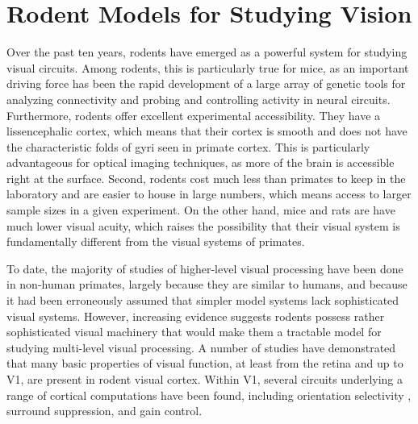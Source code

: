 \section{Rodent Models for Studying Vision}
Over the past ten years, rodents have emerged as a powerful system for studying visual circuits. Among rodents, this is particularly true for mice, as an important driving force has been the rapid development of a large array of genetic tools for analyzing connectivity and probing and controlling activity in neural circuits\cite{Luo2008, Luo2018}. Furthermore, rodents offer excellent experimental accessibility. They have a lissencephalic cortex, which means that their cortex is smooth and does not have the characteristic folds of gyri seen in primate cortex. This is particularly advantageous for optical imaging techniques, as more of the brain is accessible right at the surface. Second, rodents cost much less than primates to keep in the laboratory and are easier to house in large numbers, which means access to larger sample sizes in a given experiment. On the other hand, mice and rats are have much lower visual acuity, which raises the possibility that their visual system is fundamentally different from the visual systems of primates. 

To date, the majority of studies of higher-level visual processing have been done in non-human primates, largely because they are similar to humans, and because it had been erroneously assumed that simpler model systems lack sophisticated visual systems. However, increasing evidence suggests rodents possess rather sophisticated visual machinery that would make them a tractable model for studying multi-level visual processing. A number of studies have demonstrated that many basic properties of visual function, at least from the retina and up to V1, are present in rodent visual cortex\cite{HubermanNiell2011}. Within V1, several circuits underlying a range of cortical computations have been found, including orientation selectivity \cite{Ko2011, Lien2013TunedCircuits}, surround suppression\cite{Adesnik2012}, and gain control\cite{Atallah2012}. 

